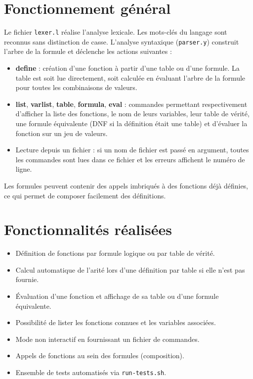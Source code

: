 \documentclass[11pt,a4paper]{article}
\begin{document}
\section*{Fonctionnement général}
Le fichier \texttt{lexer.l} réalise l'analyse lexicale. Les mots-clés du langage sont reconnus sans distinction de casse. L'analyse syntaxique (\texttt{parser.y}) construit l'arbre de la formule et déclenche les actions suivantes :
\begin{itemize}
  \item \textbf{define} : création d'une fonction à partir d'une table ou d'une formule. La table est soit lue directement, soit calculée en évaluant l'arbre de la formule pour toutes les combinaisons de valeurs.
  \item \textbf{list}, \textbf{varlist}, \textbf{table}, \textbf{formula}, \textbf{eval} : commandes permettant respectivement d'afficher la liste des fonctions, le nom de leurs variables, leur table de vérité, une formule équivalente (DNF si la définition était une table) et d'évaluer la fonction sur un jeu de valeurs.
  \item Lecture depuis un fichier : si un nom de fichier est passé en argument, toutes les commandes sont lues dans ce fichier et les erreurs affichent le numéro de ligne.
\end{itemize}
Les formules peuvent contenir des appels imbriqués à des fonctions déjà définies, ce qui permet de composer facilement des définitions.

\section*{Fonctionnalités réalisées}
\begin{itemize}
  \item Définition de fonctions par formule logique ou par table de vérité.
  \item Calcul automatique de l'arité lors d'une définition par table si elle n'est pas fournie.
  \item Évaluation d'une fonction et affichage de sa table ou d'une formule équivalente.
  \item Possibilité de lister les fonctions connues et les variables associées.
  \item Mode non interactif en fournissant un fichier de commandes.
  \item Appels de fonctions au sein des formules (composition).
  \item Ensemble de tests automatisés via \texttt{run-tests.sh}.
\end{itemize}
\end{document}
